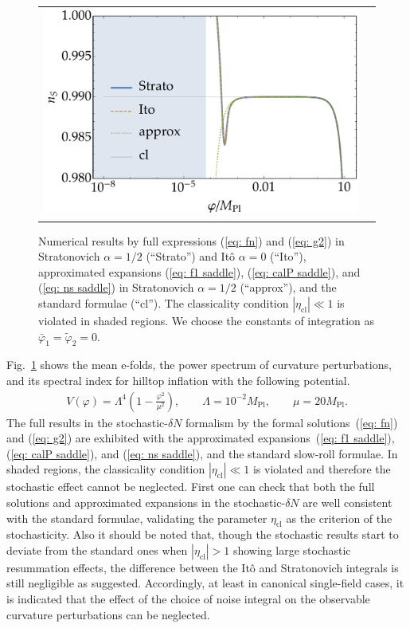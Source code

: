 \documentclass[aps, prd
, preprint
, nofootinbib 
, superscriptaddress
, longbibliography
]{revtex4-1}
\newcommand{\Mpl}{M_\text{Pl}}
\newcommand{\cl}{\text{cl}}
\newcommand{\bae}[1]{\begin{align} #1 \end{align}}
\begin{document}
\begin{figure}
\begin{tabular}{cc}
\begin{minipage}{0.5\hsize}
		\end{minipage}
		\begin{minipage}{0.5\hsize}
			\centering
			\includegraphics[width=\hsize]{figs/ns_mag.pdf}
		\end{minipage}
	\end{tabular}
	\caption{Numerical results by full expressions (\ref{eq: fn}) and (\ref{eq: g2}) in Stratonovich $\alpha=1/2$ (“Strato”) and It\^o $\alpha=0$ (“Ito”), 
	approximated expansions (\ref{eq: f1 saddle}), (\ref{eq: calP saddle}), and (\ref{eq: ns saddle}) in Stratonovich $\alpha=1/2$ (“approx”), 
	and the standard formulae (“cl”). The classicality condition $|\eta_\cl|\ll1$ is violated in shaded regions. We choose the constants of integration as 
	$\bar{\varphi}_1=\tilde{\varphi}_2=0$.}
	\label{fig: hilltop}
\end{figure}

Fig.~\ref{fig: hilltop} shows the mean e-folds, the power spectrum of curvature perturbations, and its spectral index for hilltop inflation with the following potential.
\bae{
	V(\varphi)=\Lambda^4\left(1-\frac{\varphi^2}{\mu^2}\right), \qquad \Lambda=10^{-2}\Mpl, \qquad \mu=20\Mpl.
}
The full results in the stochastic-$\delta N$ formalism by the formal solutions~(\ref{eq: fn}) and (\ref{eq: g2}) are exhibited with the approximated expansions~(\ref{eq: f1 saddle}), (\ref{eq: calP saddle}), and (\ref{eq: ns saddle}), and the standard slow-roll formulae.
In shaded regions, the classicality condition $|\eta_\cl|\ll1$ is violated and therefore the stochastic effect cannot be neglected.
First one can check that both the full solutions and approximated expansions in the stochastic-$\delta N$ are well consistent with the standard formulae, validating the parameter $\eta_\cl$ as the criterion of the stochasticity.
Also it should be noted that, though the stochastic results start to deviate from the standard ones when $|\eta_\cl|>1$ showing large stochastic resummation effects, the difference between the It\^o and Stratonovich integrals is still negligible as suggested.
Accordingly, at least in canonical single-field cases,
it is indicated that the effect of the choice of noise integral on the observable curvature perturbations can be neglected.
\end{document}
